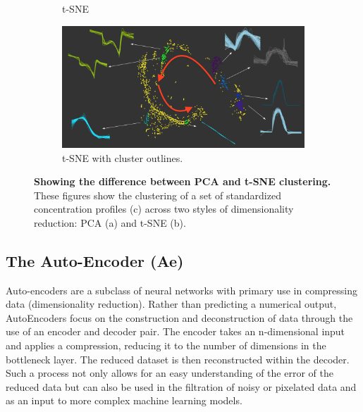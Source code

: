 \begin{figure}[H]
\begin{subfigure}[b]{0.495\textwidth}
         \caption{t-SNE}
         \label{fig:tsnec}
     \end{subfigure}
     \hfill \hfill
     \begin{subfigure}[b]{\textwidth}
         \centering
         \includegraphics[width=\textwidth]{4fig/ptsneall.png}
         \caption{t-SNE with cluster outlines.}
         \label{fig:tco}
     \end{subfigure}
        \caption{\textbf{Showing the difference between PCA and t-SNE clustering.} These figures show the clustering of a set of standardized concentration profiles (c) across two styles of dimensionality reduction: PCA (a) and t-SNE (b).}
        \label{fig:threegraphs}
\end{figure}




\subsection{The Auto-Encoder (Ae)}
Auto-encoders are a subclass of neural networks with primary use in compressing data (dimensionality reduction). Rather than predicting a numerical output, AutoEncoders focus on the construction and deconstruction of data through the use of an encoder and decoder pair. The encoder takes an n-dimensional input and applies a compression, reducing it to the number of dimensions in the bottleneck layer. The reduced dataset is then reconstructed within the decoder. Such a process not only allows for an easy understanding of the error of the reduced data but can also be used in the filtration of noisy or pixelated data \citep{aenoise,aeim} and as an input to more complex machine learning models.\


